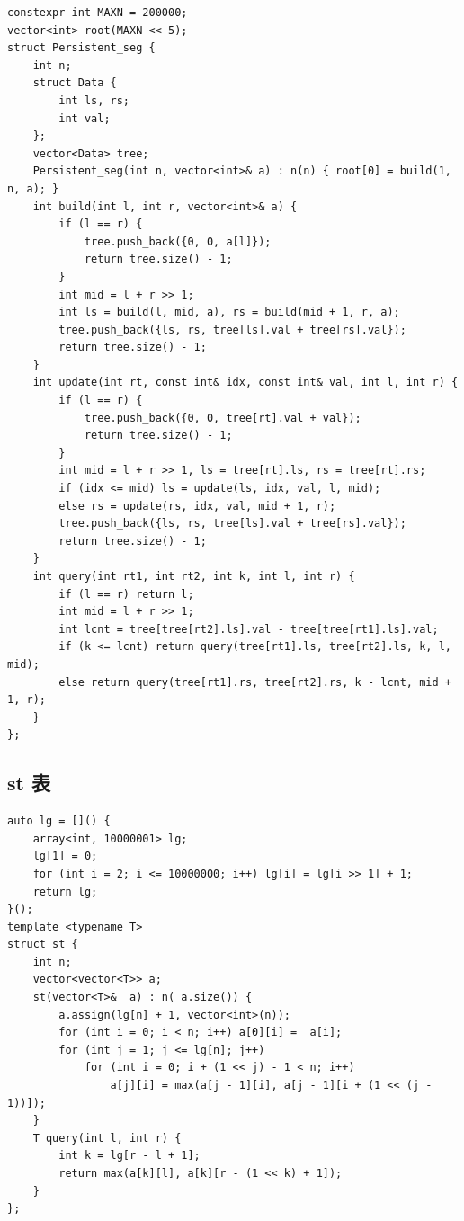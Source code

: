 \documentclass[UTF8, twoside]{ctexart}
\begin{document}
\begin{sloppypar}
\begin{lstlisting}[style=cpp]
constexpr int MAXN = 200000;
vector<int> root(MAXN << 5);
struct Persistent_seg {
    int n;
    struct Data {
        int ls, rs;
        int val;
    };
    vector<Data> tree;
    Persistent_seg(int n, vector<int>& a) : n(n) { root[0] = build(1, n, a); }
    int build(int l, int r, vector<int>& a) {
        if (l == r) {
            tree.push_back({0, 0, a[l]});
            return tree.size() - 1;
        }
        int mid = l + r >> 1;
        int ls = build(l, mid, a), rs = build(mid + 1, r, a);
        tree.push_back({ls, rs, tree[ls].val + tree[rs].val});
        return tree.size() - 1;
    }
    int update(int rt, const int& idx, const int& val, int l, int r) {
        if (l == r) {
            tree.push_back({0, 0, tree[rt].val + val});
            return tree.size() - 1;
        }
        int mid = l + r >> 1, ls = tree[rt].ls, rs = tree[rt].rs;
        if (idx <= mid) ls = update(ls, idx, val, l, mid);
        else rs = update(rs, idx, val, mid + 1, r);
        tree.push_back({ls, rs, tree[ls].val + tree[rs].val});
        return tree.size() - 1;
    }
    int query(int rt1, int rt2, int k, int l, int r) {
        if (l == r) return l;
        int mid = l + r >> 1;
        int lcnt = tree[tree[rt2].ls].val - tree[tree[rt1].ls].val;
        if (k <= lcnt) return query(tree[rt1].ls, tree[rt2].ls, k, l, mid);
        else return query(tree[rt1].rs, tree[rt2].rs, k - lcnt, mid + 1, r);
    }
};
\end{lstlisting}

\subsection{st 表}

\begin{lstlisting}[style=cpp]
auto lg = []() {
    array<int, 10000001> lg;
    lg[1] = 0;
    for (int i = 2; i <= 10000000; i++) lg[i] = lg[i >> 1] + 1;
    return lg;
}();
template <typename T>
struct st {
    int n;
    vector<vector<T>> a;
    st(vector<T>& _a) : n(_a.size()) {
        a.assign(lg[n] + 1, vector<int>(n));
        for (int i = 0; i < n; i++) a[0][i] = _a[i];
        for (int j = 1; j <= lg[n]; j++)
            for (int i = 0; i + (1 << j) - 1 < n; i++)
                a[j][i] = max(a[j - 1][i], a[j - 1][i + (1 << (j - 1))]);
    }
    T query(int l, int r) {
        int k = lg[r - l + 1];
        return max(a[k][l], a[k][r - (1 << k) + 1]);
    }
};
\end{lstlisting}


\end{sloppypar}
\end{document}
